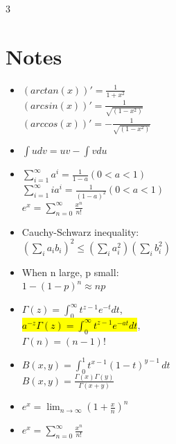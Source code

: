 \documentclass[a4paper,10pt]{article}
\begin{document}
\begin{multicols}{3}
\section*{Notes}
\begin{itemize}
    \item $(arctan(x))'=\frac{1}{1+x^2}$\\
    $(arcsin(x))'=\frac{1}{\sqrt{(1-x^2)}}$\\
    $(arccos(x))'=-\frac{1}{\sqrt{(1-x^2)}}$
    \item $\int udv=uv-\int vdu$
    \item $\sum_{i=1}^\infty a^i=\frac{1}{1-a}(0<a<1)$\\
    $\sum_{i=1}^\infty ia^i=\frac{1}{(1-a)^2}(0<a<1)$\\
    $e^x=\sum_{n=0}^\infty\frac{x^n}{n!}$
    \item Cauchy-Schwarz inequality:\\ $(\sum_ia_ib_i)^2\le (\sum_i a_i^2)(\sum_i b_i^2)$
    \item When n large, p small:\\ $1-(1-p)^n\approx np$
    \item $\Gamma(z)=\int_0^\infty t^{z-1}e^{-t}dt$, \\
    \hl{$a^{-z}\Gamma(z)=\int_0^\infty t^{z-1}e^{-at}dt$}, \\$\Gamma (n)=(n-1)!$
    \item $B(x, y) = \int_0^1 t^{x-1} (1 - t)^{y-1} \, dt$\\
    $B(x, y) = \frac{\Gamma(x) \Gamma(y)}{\Gamma(x + y)}$\\
    \item $e^x = \lim_{n \to \infty} \left( 1 + \frac{x}{n} \right)^n$
    \item $e^x=\sum_{n=0}^{\infty}\frac{x^n}{n!}$
\end{itemize}



\end{multicols}
\end{document}
